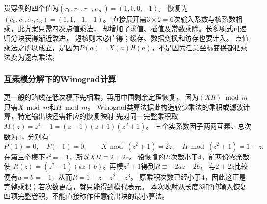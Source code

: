 贯穿例的四个值为$(r_0,r_+,r_-,r_\infty)=(1,0,0,-1)$，
恢复为$(c_0,c_1,c_2,c_3)=(1,1,-1,-1)$。
直接展开需$3\times2=6$次输入系数与核系数相乘，此方案只需四次点值乘法，
却增加了求值、插值及常数乘除。长多项式可递归分块获得渐近改进，
短核则未必值得；缓存、数据变换和访存也要计入。
点值乘法之所以成立，是因为$P(a)=X(a)H(a)$，不是因为任意坐标变换都把乘法变为逐点乘法。

\subsubsection{互素模分解下的Winograd计算}

更一般的路线在低次模下先相乘，再用中国剩余定理恢复，
因为$(XH)\bmod m$只需$X\bmod m$和$H\bmod m$。
Winograd类算法据此构造较少乘法的乘积或滤波计算，特定输出块还需相应的恢复映射
先对同一完整乘积取
$M(z)=z^4-1=(z-1)(z+1)(z^2+1)$。
三个实系数因子两两互素、总次数为$4$，分别有
\[
  P(1)=0,\quad P(-1)=0,\qquad
  X\bmod(z^2+1)=2z,\quad H\bmod(z^2+1)=1-z.
\]
在第三个模下$z^2=-1$，所以$XH\equiv2+2z$。
设恢复的$R$次数小于$4$，前两份零余数使
$R(z)=(z^2-1)(az+b)$。再模$z^2+1$得到$R\equiv-2az-2b$，
与$2+2z$比较便有$a=b=-1$，从而$R=1+z-z^2-z^3$。
原乘积次数已经小于$4$，因此这正是完整乘积；若次数更高，就只能得到模代表元。
本次映射从长度$3$和$2$的输入恢复四项完整卷积，不能直接称作任意输出块的最小算法。

